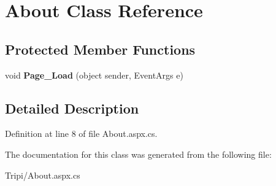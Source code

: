 \hypertarget{class_about}{
\section{About Class Reference}
\label{class_about}
}
\subsection*{Protected Member Functions}
\begin{DoxyCompactItemize}
\item 
\hypertarget{class_about_ac3b7c5ec7a5d73224de2feea9414e555}{
void {\bfseries Page\_\-Load} (object sender, EventArgs e)}
\label{class_about_ac3b7c5ec7a5d73224de2feea9414e555}

\end{DoxyCompactItemize}


\subsection{Detailed Description}


Definition at line 8 of file About.aspx.cs.

The documentation for this class was generated from the following file:\begin{DoxyCompactItemize}
\item 
Tripi/About.aspx.cs\end{DoxyCompactItemize}
